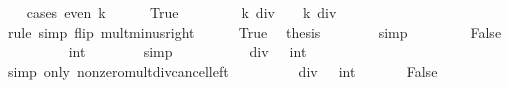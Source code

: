 \begin{isabellebody}
\ \ \isamarkupfalse%
\ {\isacharparenleft}{\kern0pt}cases\ {\isacartoucheopen}even\ k{\isacartoucheclose}{\isacharparenright}{\kern0pt}\isanewline
\ \ \ \ \isamarkupfalse%
\ True\isanewline
\ \ \ \ \isamarkupfalse%
\ \isamarkupfalse%
\ {\isacartoucheopen}{\isacharminus}{\kern0pt}\ k\ div\ {}\ {\isacharequal}{\kern0pt}\ {\isacharminus}{\kern0pt}\ {\isacharparenleft}{\kern0pt}k\ div\ {}{\isacharparenright}{\kern0pt}{\isacartoucheclose}\isanewline
\ \ \ \ \ \ \isamarkupfalse%
\ rule\ {\isacharparenleft}{\kern0pt}simp\ flip{\isacharcolon}{\kern0pt}\ mult{\isacharunderscore}{\kern0pt}minus{\isacharunderscore}{\kern0pt}right{\isacharparenright}{\kern0pt}\isanewline
\ \ \ \ \isamarkupfalse%
\ True\ \isamarkupfalse%
\ {\isacharquery}{\kern0pt}thesis\isanewline
\ \ \ \ \ \ \isamarkupfalse%
\ simp\isanewline
\ \ \isamarkupfalse%
\isanewline
\ \ \ \ \isamarkupfalse%
\ False\isanewline
\ \ \ \ \isamarkupfalse%
\ {\isacartoucheopen}{}\ {\isacharequal}{\kern0pt}\ {}\ {\isacharasterisk}{\kern0pt}\ {\isacharparenleft}{\kern0pt}{}{\isacharcolon}{\kern0pt}{\isacharcolon}{\kern0pt}int{\isacharparenright}{\kern0pt}{\isacartoucheclose}\isanewline
\ \ \ \ \ \ \isamarkupfalse%
\ simp\isanewline
\ \ \ \ \isamarkupfalse%
\ \isamarkupfalse%
\ {\isacartoucheopen}{}\ {\isacharasterisk}{\kern0pt}\ {}\ div\ {}\ {\isacharequal}{\kern0pt}\ {\isacharparenleft}{\kern0pt}{}{\isacharcolon}{\kern0pt}{\isacharcolon}{\kern0pt}int{\isacharparenright}{\kern0pt}{\isacartoucheclose}\isanewline
\ \ \ \ \ \ \isamarkupfalse%
\ {\isacharparenleft}{\kern0pt}simp\ only{\isacharcolon}{\kern0pt}\ nonzero{\isacharunderscore}{\kern0pt}mult{\isacharunderscore}{\kern0pt}div{\isacharunderscore}{\kern0pt}cancel{\isacharunderscore}{\kern0pt}left{\isacharparenright}{\kern0pt}\isanewline
\ \ \ \ \isamarkupfalse%
\ \isamarkupfalse%
\ {\isacharasterisk}{\kern0pt}{\isacharcolon}{\kern0pt}\ {\isacartoucheopen}{}\ div\ {}\ {\isacharequal}{\kern0pt}\ {\isacharparenleft}{\kern0pt}{}{\isacharcolon}{\kern0pt}{\isacharcolon}{\kern0pt}int{\isacharparenright}{\kern0pt}{\isacartoucheclose}\ \isacommand{{\isachardot}{\kern0pt}}\isamarkupfalse%
\isanewline
\ \ \ \ \isamarkupfalse%
\ False\ \isamarkupfalse%

\end{isabellebody}
